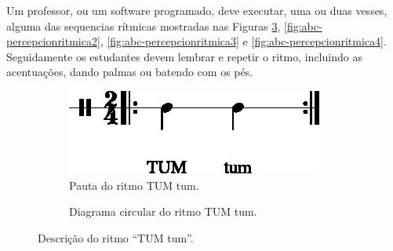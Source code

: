 \begin{example}
Um professor, ou um software programado, 
deve executar, uma ou duas vesses, alguma das sequencias rítmicas mostradas nas Figuras 
\ref{fig:abc-percepcionritmica1}, \ref{fig:abc-percepcionritmica2},
\ref{fig:abc-percepcionritmica3}  e \ref{fig:abc-percepcionritmica4}.
Seguidamente os estudantes devem lembrar e repetir o ritmo, 
incluindo as acentuações, dando palmas ou batendo com os pés.
\end{example}


\begin{figure}[H]
\centering
     \begin{subfigure}[c]{0.45\textwidth}
         \centering
         \includegraphics[width=\textwidth]{chapters/cap-musicalidade-percepcion/treino-ritmo1-1.eps}
         \caption{Pauta do ritmo TUM tum.}
         \label{fig:RitmoTUMtum1}
     \end{subfigure}
     \hfill
     \begin{subfigure}[c]{0.45\textwidth}
         \centering
{}
         \caption{Diagrama circular do ritmo TUM tum.}
         \label{fig:RitmoTUMtum2}
     \end{subfigure}
\caption{Descrição do ritmo ``TUM tum''.}
\label{fig:abc-percepcionritmica1}
\end{figure}


